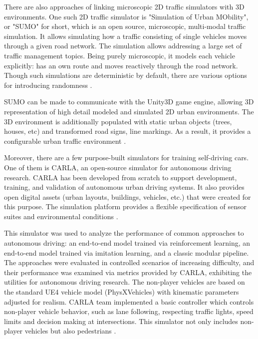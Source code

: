 \documentclass{VUMIFPS-master-intro}
\begin{document}
There are also approaches of linking microscopic 2D traffic simulators with 3D 
environments. One such 2D traffic simulator is "Simulation of Urban MObility", 
or "SUMO" for short, which is an open source, microscopic, multi-modal traffic 
simulation. It allows simulating how a traffic consisting of single vehicles 
moves through a given road network. The simulation allows addressing a large 
set of traffic management topics. Being purely microscopic, it models each 
vehicle explicitly: has an own route and moves reactively through the road 
network. Though such simulations are deterministic by default, there are 
various options for introducing randomness \cite{Behrisch2011}.

SUMO can be made to communicate with the Unity3D game engine, allowing 3D representation of high detail modeled and simulated 2D urban environments. The 3D environment is additionally populated with static urban objects (trees, houses, etc) and transformed road signs, line markings. As a result, it provides a configurable urban traffic environment \cite{Biurrun2017}. 

Moreover, there are a few purpose-built simulators for training self-driving cars. One of them is CARLA, an open-source simulator for autonomous driving research. CARLA has been developed from scratch to support development, training, and validation of autonomous urban driving systems. It also provides open digital assets (urban layouts, buildings, vehicles, etc.) that were created for this purpose. The simulation platform provides a flexible specification of sensor suites and environmental conditions \cite{Dosovitskiy2017}. 

This simulator was used to analyze the performance of common approaches to autonomous driving: an end-to-end model trained via reinforcement learning, an end-to-end model trained via imitation learning, and a classic modular pipeline. The approaches were evaluated in controlled scenarios of increasing difficulty, and their performance was examined via metrics provided by CARLA, exhibiting the utilities for autonomous driving research. 
The non-player vehicles are based on the standard UE4 vehicle model (PhysXVehicles) with kinematic parameters adjusted for realism. CARLA team implemented a basic controller which controls non-player vehicle behavior, such as lane following, respecting traffic lights, speed limits and decision making at intersections. This simulator not only includes non-player vehicles but also pedestrians \cite{Dosovitskiy2017}. 
\end{document}
